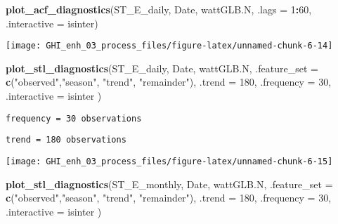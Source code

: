 \documentclass[
  10pt,
  a4paper,oneside]{article}
\newenvironment{Shaded}{\begin{snugshade}}{\end{snugshade}}
\newcommand{\AttributeTok}[1]{\textcolor[rgb]{0.13,0.29,0.53}{#1}}
\newcommand{\DecValTok}[1]{\textcolor[rgb]{0.00,0.00,0.81}{#1}}
\newcommand{\FunctionTok}[1]{\textcolor[rgb]{0.13,0.29,0.53}{\textbf{#1}}}
\newcommand{\NormalTok}[1]{#1}
\newcommand{\SpecialCharTok}[1]{\textcolor[rgb]{0.81,0.36,0.00}{\textbf{#1}}}
\newcommand{\StringTok}[1]{\textcolor[rgb]{0.31,0.60,0.02}{#1}}
\begin{document}
\begin{Shaded}
\begin{Highlighting}[]
\FunctionTok{plot\_acf\_diagnostics}\NormalTok{(ST\_E\_daily, Date, wattGLB.N, }\AttributeTok{.lags =} \DecValTok{1}\SpecialCharTok{:}\DecValTok{60}\NormalTok{, }\AttributeTok{.interactive =}\NormalTok{ isinter)}
\end{Highlighting}
\end{Shaded}

\begin{center}\texttt{[image: GHI\_enh\_03\_process\_files/figure-latex/unnamed-chunk-6-14]} \end{center}

\begin{Shaded}
\begin{Highlighting}[]
\FunctionTok{plot\_stl\_diagnostics}\NormalTok{(ST\_E\_daily, Date, wattGLB.N,}
                     \AttributeTok{.feature\_set =} \FunctionTok{c}\NormalTok{(}\StringTok{"observed"}\NormalTok{,}\StringTok{"season"}\NormalTok{, }\StringTok{"trend"}\NormalTok{, }\StringTok{"remainder"}\NormalTok{),}
                     \AttributeTok{.trend =} \DecValTok{180}\NormalTok{,}
                     \AttributeTok{.frequency =} \DecValTok{30}\NormalTok{,}
                     \AttributeTok{.interactive =}\NormalTok{ isinter}
\NormalTok{                     )}
\end{Highlighting}
\end{Shaded}

\begin{verbatim}
frequency = 30 observations
\end{verbatim}

\begin{verbatim}
trend = 180 observations
\end{verbatim}

\begin{center}\texttt{[image: GHI\_enh\_03\_process\_files/figure-latex/unnamed-chunk-6-15]} \end{center}

\begin{Shaded}
\begin{Highlighting}[]
\FunctionTok{plot\_stl\_diagnostics}\NormalTok{(ST\_E\_monthly, Date, wattGLB.N,}
                     \AttributeTok{.feature\_set =} \FunctionTok{c}\NormalTok{(}\StringTok{"observed"}\NormalTok{,}\StringTok{"season"}\NormalTok{, }\StringTok{"trend"}\NormalTok{, }\StringTok{"remainder"}\NormalTok{),}
                     \AttributeTok{.trend =} \DecValTok{180}\NormalTok{,}
                     \AttributeTok{.frequency =} \DecValTok{30}\NormalTok{,}
                     \AttributeTok{.interactive =}\NormalTok{ isinter}
\NormalTok{                     )}
\end{Highlighting}
\end{Shaded}
\end{document}
